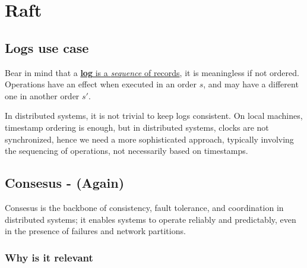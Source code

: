 \chapter{Raft}


\section{Logs use case}
Bear in mind that a \ul{\textbf{log} is a \textit{sequence} of records}, it is meaningless if not ordered.
Operations have an effect when executed in an order $s$, and may have a different one in another order $s'$.

In distributed systems, it is not trivial to keep logs consistent.
On local machines, timestamp ordering is enough, but in distributed systems, clocks are not synchronized, hence we need a more sophisticated approach, typically involving the sequencing of operations, not necessarily based on timestamps.

\section{Consesus - (Again)}
Consesus is the backbone of consistency, fault tolerance, and coordination in distributed systems;
it enables systems to operate reliably and predictably, even in the presence of failures and network partitions.

\subsection{Why is it relevant}




